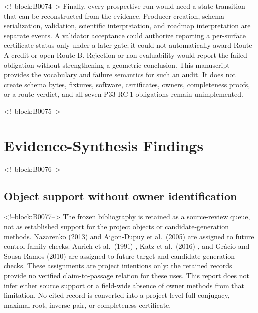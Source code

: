 \documentclass[11pt,a4paper]{article}
\begin{document}
<!--block:B0074-->
Finally, every prospective run would need a state transition that can be reconstructed from the evidence. Producer creation, schema serialization, validation, scientific interpretation, and roadmap interpretation are separate events. A validator acceptance could authorize reporting a per-surface certificate status only under a later gate; it could not automatically award Route-A credit or open Route B. Rejection or non-evaluability would report the failed obligation without strengthening a geometric conclusion. This manuscript provides the vocabulary and failure semantics for such an audit. It does not create schema bytes, fixtures, software, certificates, owners, completeness proofs, or a route verdict, and all seven P33-RC-1 obligations remain unimplemented.

<!--block:B0075-->
\hypertarget{evidence-synthesis-findings}{%
\section{Evidence-Synthesis Findings}\label{evidence-synthesis-findings}}

<!--block:B0076-->
\hypertarget{object-support-without-owner-identification}{%
\subsection{Object support without owner identification}\label{object-support-without-owner-identification}}

<!--block:B0077-->
The frozen bibliography is retained as a source-review queue, not as established support for the project objects or candidate-generation methods. Nazarenko (2013)
\citep{P33-S01}
 and Aigon-Dupuy et al.~(2005)
\citep{P33-S02}
 are assigned to future control-family checks. Aurich et al.~(1991)
\citep{P33-S05}
, Katz et al.~(2016)
\citep{P33-S08}
, and Grácio and Sousa Ramos (2010)
\citep{P33-S09}
 are assigned to future target and candidate-generation checks. These assignments are project intentions only: the retained records provide no verified claim-to-passage relation for these uses. This report does not infer either source support or a field-wide absence of owner methods from that limitation. No cited record is converted into a project-level full-conjugacy, maximal-root, inverse-pair, or completeness certificate.
\end{document}

